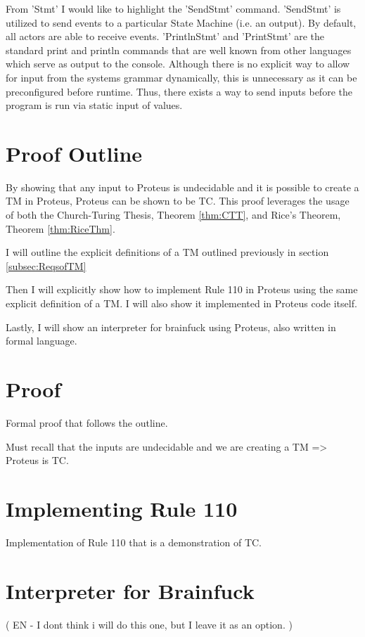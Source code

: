 From 'Stmt' I would like to highlight the 'SendStmt' command.
'SendStmt' is utilized to send events to a particular State Machine (i.e. an output).
By default, all actors are able to receive events.
'PrintlnStmt' and 'PrintStmt' are the standard print and println commands that are well known from other languages which serve as output to the console.
Although there is no explicit way to allow for input from the systems grammar dynamically, this is unnecessary as it can be preconfigured before runtime.
Thus, there exists a way to send inputs before the program is run via static input of values.

\section{Proof Outline}\label{sec:ProofOutline}

By showing that any input to Proteus is undecidable and it is possible to create a TM in Proteus, Proteus can be shown to be TC.
This proof leverages the usage of both the Church-Turing Thesis, Theorem \ref{thm:CTT}, and Rice's Theorem, Theorem \ref{thm:RiceThm}.

I will outline the explicit definitions of a TM outlined previously in section \ref{subsec:ReqsofTM}

Then I will explicitly show how to implement Rule 110 in Proteus using the same explicit definition of a TM.
I will also show it implemented in Proteus code itself.

Lastly, I will show an interpreter for brainfuck using Proteus, also written in formal language.

\section{Proof}\label{sec:Proof}

Formal proof that follows the outline.

Must recall that the inputs are undecidable and we are creating a TM => Proteus is TC.

\section{Implementing Rule 110}\label{sec:ImplementRule110}

Implementation of Rule 110 that is a demonstration of TC.

\section{Interpreter for Brainfuck}\label{sec:ImplementBF}

(
EN - I dont think i will do this one, but I leave it as an option.
)